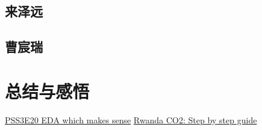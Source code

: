 \documentclass{ctexart}
\begin{document}
\subsection{来泽远}

\subsection{曹宸瑞}

\section{总结与感悟}

\begin{thebibliography}{100}
\href{https://www.kaggle.com/code/ambrosm/pss3e20-eda-which-makes-sense}{PSS3E20 EDA which makes sense}
\href{https://www.kaggle.com/code/kacperrabczewski/rwanda-co2-step-by-step-guide}{Rwanda CO2: Step by step guide}
\end{thebibliography}
\end{document}
